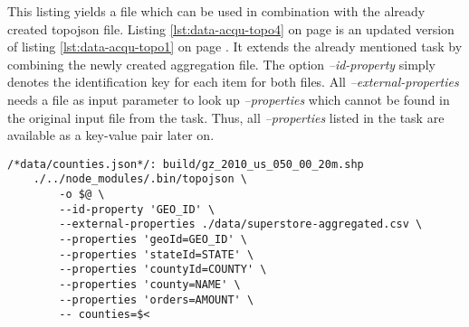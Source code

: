 This listing yields a file which can be used in combination with the already created topojson file. Listing \ref{lst:data-acqu-topo4} on page \pageref{lst:data-acqu-topo4} is an updated version of listing \ref{lst:data-acqu-topo1} on page \pageref{lst:data-acqu-topo1}. It extends the already mentioned task by combining the newly created aggregation file. The option \textit{--id-property} simply denotes the identification key for each item for both files. All \textit{--external-properties} needs a file as input parameter to look up \textit{--properties} which cannot be found in the original input file from the task. Thus, all \textit{--properties} listed in the task are available as a key-value pair later on.

\begin{lstlisting}[style={makefile}, caption={Make task for merging a file with topojson}, label={lst:data-acqu-topo4}]
/*data/counties.json*/: build/gz_2010_us_050_00_20m.shp
    ./../node_modules/.bin/topojson \
        -o $@ \
        --id-property 'GEO_ID' \
        --external-properties ./data/superstore-aggregated.csv \
        --properties 'geoId=GEO_ID' \
        --properties 'stateId=STATE' \
        --properties 'countyId=COUNTY' \
        --properties 'county=NAME' \
        --properties 'orders=AMOUNT' \
        -- counties=$<
\end{lstlisting}
